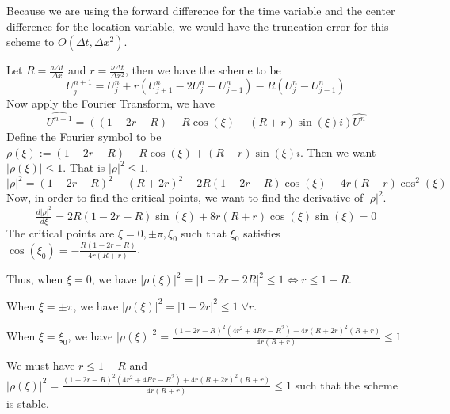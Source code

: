 \begin{answer}
    Because we are using the forward difference for the time variable and the center difference for the location variable, we would have the truncation error for this scheme to $O(\Delta t, \Delta x^2)$.
    
    Let $R = \tfrac{a \Delta t}{\Delta x}$ and $r = \tfrac{\nu \Delta t}{\Delta x^2}$, then we have the scheme to be
    \begin{equation}
        U_j^{n+1} = U_{j}^n + r(U_{j+1}^n - 2U_j^{n} + U_{j-1}^n) - R(U_j^n - U_{j-1}^n)
    \end{equation}
    Now apply the Fourier Transform, we have
    \begin{equation}
        \widehat{U^{n+1}}=((1-2r-R)-R\cos(\xi)+(R+r)\sin(\xi)i) \widehat{U^n}
    \end{equation}
    Define the Fourier symbol to be $\rho(\xi) := (1-2r-R)-R\cos(\xi)+(R+r)\sin(\xi)i$. Then we want $\lvert \rho(\xi) \rvert \leq 1$. That is $\lvert \rho \rvert^2 \leq 1$.
    \begin{equation}
        \lvert \rho \rvert^2 = (1-2r-R)^2 + (R+2r)^2 - 2R(1-2r-R)\cos(\xi)-4r(R+r)\cos^{2}(\xi)
    \end{equation}
    Now, in order to find the critical points, we want to find the derivative of $\lvert \rho \rvert^2$.
    \begin{equation}
        \tfrac{d\lvert \rho \rvert^2}{d\xi} = 2R(1-2r-R)\sin(\xi)+8r(R+r)\cos(\xi)\sin(\xi)= 0
    \end{equation}
    The critical points are $\xi = 0,\pm \pi, \xi_0$ such that $\xi_0$ satisfies $\cos(\xi_0) = -\tfrac{R(1-2r-R)}{4r(R+r)}$.
    
    Thus, when $\xi = 0$, we have $\lvert \rho(\xi) \rvert^2 = \lvert 1 - 2r -2R \rvert^2 \leq 1 \Leftrightarrow r \leq 1-R$.
    
    When $\xi = \pm \pi$, we have $\lvert \rho(\xi) \rvert^2 =  \lvert 1-2r\rvert^2 \leq 1 \; \forall r$.
    
    When $\xi = \xi_0$, we have $\lvert \rho(\xi) \rvert^2 = \tfrac{(1-2r-R)^2(4r^2+4Rr-R^2)+4r(R+2r)^2(R+r)}{4r(R+r)} \leq 1$
    
    We must have $r \leq 1-R$ and $\lvert \rho(\xi) \rvert^2 = \tfrac{(1-2r-R)^2(4r^2+4Rr-R^2)+4r(R+2r)^2(R+r)}{4r(R+r)} \leq 1$ such that the scheme is stable.
\end{answer}